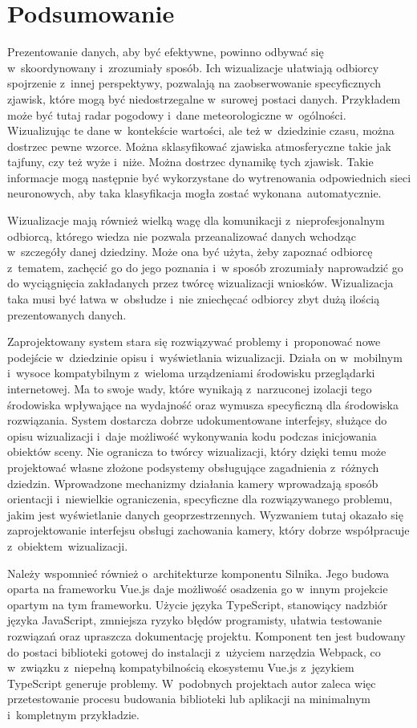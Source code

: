 \chapter{Podsumowanie}

Prezentowanie danych, aby być efektywne, powinno odbywać się w~skoordynowany i~zrozumiały sposób. Ich wizualizacje ułatwiają odbiorcy spojrzenie z~innej perspektywy, pozwalają na zaobserwowanie specyficznych zjawisk, które mogą być niedostrzegalne w~surowej postaci danych. Przykładem może być tutaj radar pogodowy i~dane meteorologiczne w~ogólności. Wizualizując te dane w~kontekście wartości, ale też w~dziedzinie czasu, można dostrzec pewne wzorce. Można sklasyfikować zjawiska atmosferyczne takie jak tajfuny, czy też wyże i~niże. Można dostrzec dynamikę tych zjawisk. Takie informacje mogą następnie być wykorzystane do wytrenowania odpowiednich sieci neuronowych, aby taka klasyfikacja mogła zostać wykonana~automatycznie. 

Wizualizacje mają również wielką wagę dla komunikacji z~nieprofesjonalnym odbiorcą, którego wiedza nie pozwala przeanalizować danych wchodząc w~szczegóły danej dziedziny. Może ona być użyta, żeby zapoznać odbiorcę z~tematem, zachęcić go do jego poznania i~w sposób zrozumiały naprowadzić go do wyciągnięcia zakładanych przez twórcę wizualizacji wniosków. Wizualizacja taka musi być łatwa w~obsłudze i~nie zniechęcać odbiorcy zbyt dużą ilością prezentowanych danych.

Zaprojektowany system stara się rozwiązywać problemy i~proponować nowe podejście w~dziedzinie opisu i~wyświetlania wizualizacji. Działa on w~mobilnym i~wysoce kompatybilnym z~wieloma urządzeniami środowisku przeglądarki internetowej. Ma to swoje wady, które wynikają z~narzuconej izolacji tego środowiska wpływające na wydajność oraz wymusza specyficzną dla środowiska rozwiązania. System dostarcza dobrze udokumentowane interfejsy, służące do opisu wizualizacji i~daje możliwość wykonywania kodu podczas inicjowania obiektów sceny. Nie ogranicza to twórcy wizualizacji, który dzięki temu może projektować własne złożone podsystemy obsługujące zagadnienia z~różnych dziedzin. Wprowadzone mechanizmy działania kamery wprowadzają sposób orientacji i~niewielkie ograniczenia, specyficzne dla rozwiązywanego problemu, jakim jest wyświetlanie danych geoprzestrzennych. Wyzwaniem tutaj okazało się zaprojektowanie interfejsu obsługi zachowania kamery, który dobrze współpracuje z~obiektem~wizualizacji.

Należy wspomnieć również o~architekturze komponentu Silnika. Jego budowa oparta na frameworku Vue.js daje możliwość osadzenia go w~innym projekcie opartym na tym frameworku. Użycie języka TypeScript, stanowiący nadzbiór języka JavaScript, zmniejsza ryzyko błędów programisty, ułatwia testowanie rozwiązań oraz upraszcza dokumentację projektu. Komponent ten jest budowany do postaci biblioteki gotowej do instalacji z~użyciem narzędzia Webpack, co w~związku z~niepełną kompatybilnością ekosystemu Vue.js z~językiem TypeScript generuje problemy. W~podobnych projektach autor zaleca więc przetestowanie procesu budowania biblioteki lub aplikacji na minimalnym i~kompletnym przykładzie.

